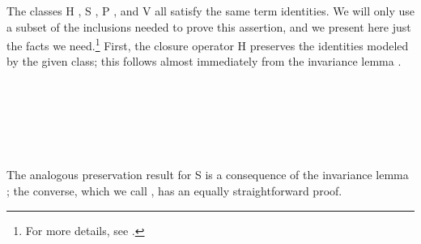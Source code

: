 The classes \af H , \af S , \af P , and \af V  all satisfy the
same term identities.  We will only use a subset of the inclusions needed to prove this
assertion, and we present here just the facts we need.\footnote{For more details, see
.}
First, the closure operator \af H preserves the identities modeled by the
given class; this follows almost immediately from the invariance lemma
.

\ifshort\else
\begin{code}%
\>[0]\<%
\\
\>[0]\AgdaSpace{}%
\AgdaModule{\AgdaUnderscore{}}%
\>[10]\AgdaSymbol{\{}\AgdaSpace{}%
\AgdaSymbol{:}\AgdaSpace{}%
\AgdaSpace{}%
\AgdaSymbol{\}\{}\AgdaSpace{}%
\AgdaSymbol{:}\AgdaSpace{}%
\AgdaSymbol{(}\AgdaSpace{}%
\AgdaSpace{}%
\AgdaSymbol{)}\AgdaSpace{}%
\AgdaSymbol{(}\AgdaSpace{}%
\AgdaSpace{}%
\AgdaSpace{}%
\AgdaSpace{}%
\AgdaSpace{}%
\AgdaSymbol{)\}\{}\AgdaSpace{}%
\AgdaSpace{}%
\AgdaSymbol{:}\AgdaSpace{}%
\AgdaSpace{}%
\AgdaSymbol{\}}\AgdaSpace{}%
\<%
\end{code}
\fi
\begin{code}%
\>[0]\<%
\\
\>[0][@{}l@{\AgdaIndent{1}}]%
\>[1]\AgdaSpace{}%
\AgdaSymbol{:}\AgdaSpace{}%
\AgdaSpace{}%
\AgdaSpace{}%
\AgdaSpace{}%
\AgdaSpace{}%
\AgdaSpace{}%
\AgdaSpace{}%
\AgdaSymbol{\{}\AgdaSpace{}%
\AgdaSymbol{=}\AgdaSpace{}%
\AgdaSymbol{\}\{}\AgdaSymbol{\}}\AgdaSpace{}%
\AgdaSpace{}%
\AgdaSpace{}%
\AgdaSpace{}%
\AgdaSpace{}%
\<%
\\
%
\>[1]\AgdaSpace{}%
\AgdaSpace{}%
\AgdaSpace{}%
\AgdaSymbol{(}\AgdaSpace{}%
\AgdaOperator{\AgdaInductiveConstructor{,}}\AgdaSpace{}%
\AgdaSpace{}%
\AgdaOperator{\AgdaInductiveConstructor{,}}\AgdaSpace{}%
\AgdaSymbol{)}\AgdaSpace{}%
\AgdaSymbol{=}\AgdaSpace{}%
\AgdaSymbol{\{}\AgdaSpace{}%
\AgdaSymbol{=}\AgdaSpace{}%
\AgdaSymbol{\}\{}\AgdaSymbol{\}}\AgdaSpace{}%
\AgdaSymbol{(}\AgdaSpace{}%
\AgdaSpace{}%
\AgdaSymbol{)}\AgdaSpace{}%
\<%
\\
\>[0]\<%
\end{code}
The analogous preservation result for \af S is a consequence of
the invariance lemma ; the converse, which we call
, has an equally straightforward proof.

